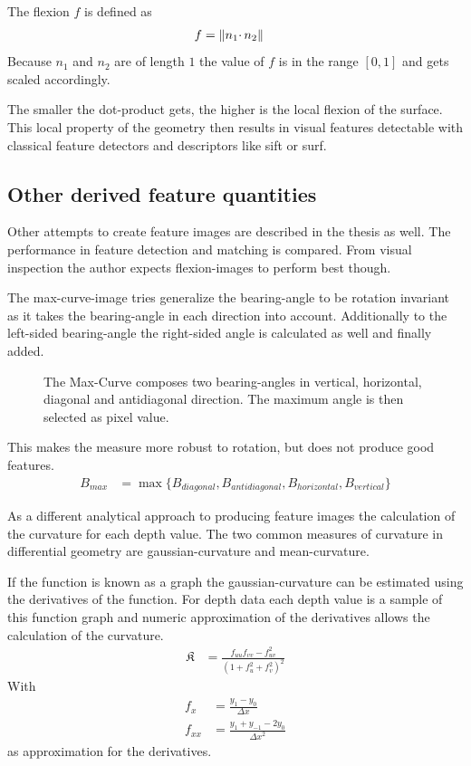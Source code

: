 \documentclass[doktyp=marbeit,fontsize=12pt,sprache=english,draft=true,hausschrift=true,fleqn]{TUBAFarbeiten}
\DeclarePairedDelimiter{\abs}{\lVert}{\rVert} %
\begin{document}
The flexion $f$ is defined as
\begin{align}
    f &= \abs{n_1 \cdotp n_2}
\end{align}
Because $n_1$ and $n_2$ are of length $1$ the value of $f$ is in the range $[0, 1]$ and gets scaled accordingly.

The smaller the dot-product gets, the higher is the local flexion of the
surface. This local property of the geometry then results in visual
features detectable with classical feature detectors and descriptors like
\Gls{sift} or \Gls{surf}.

\subsection{Other derived feature quantities}

Other attempts to create feature images are described in the thesis as well.
The performance in feature detection and matching is compared.
From visual inspection the author expects \Glspl{flexion-image} to perform best though.

The \gls{max-curve-image} tries generalize the \gls{bearing-angle} to be rotation invariant as it takes the \gls{bearing-angle} in each direction into account.
Additionally to the left-sided \gls{bearing-angle} the right-sided angle is calculated as well and finally added.

\begin{figure}
    
    \caption[Schematic Representation of the Max-Curve]{The Max-Curve composes two \Glspl{bearing-angle} in vertical, horizontal, diagonal and antidiagonal direction. The maximum angle is then selected as pixel value.}
\end{figure}

This makes the measure more robust to rotation, but does not produce good features.
\begin{align}
    B_{max} &= \max{\{B_{diagonal}, B_{antidiagonal}, B_{horizontal}, B_{vertical}\}}
\end{align}

As a different analytical approach to producing feature images the calculation of the \gls{curvature} for each depth value.
The two common measures of curvature in differential geometry are \gls{gaussian-curvature} and \gls{mean-curvature}\cite{Kuhnel2008}.

If the function is known as a graph the \Gls{gaussian-curvature} can be estimated using the derivatives of the function.
For depth data each depth value is a sample of this function graph and numeric approximation of the derivatives allows the calculation of the curvature.
\begin{align}
    \mathfrak{K} &= \frac{f_{uu} f_{vv} - f_{uv}^2}{{(1 + f_u^2 + f_v^2)}^2}
\end{align}
With
\begin{align*}
    f_{x} &= \frac{y_1 - y_0}{\Delta x} \\
    f_{xx} &= \frac{y_1 + y_{-1} - 2 y_0}{{\Delta x}^2}
\end{align*}
as approximation for the derivatives.
\end{document}
